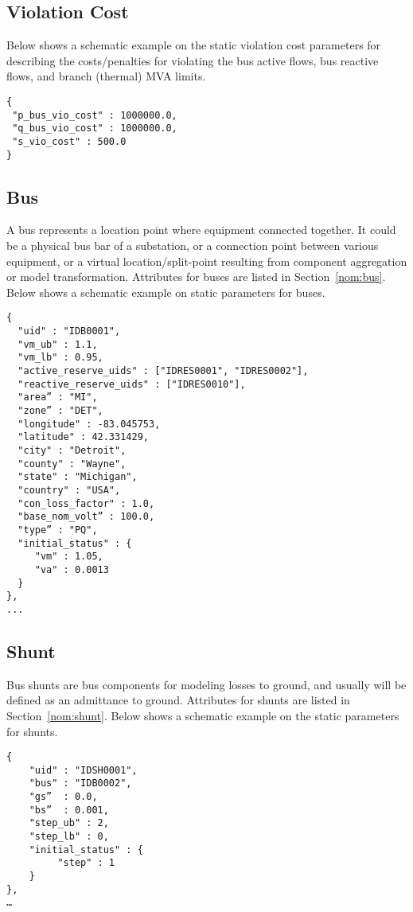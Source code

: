 \subsection{Violation Cost}
\label{sec:violation}
Below shows a schematic example on the static violation cost parameters for 
describing the costs/penalties for violating the bus active flows, bus reactive flows, 
and branch (thermal) MVA limits. 

\begin{verbatim}
{
 "p_bus_vio_cost" : 1000000.0,
 "q_bus_vio_cost" : 1000000.0,
 "s_vio_cost" : 500.0
}
\end{verbatim}


\subsection{Bus}
\label{sec:bus}
A bus represents a location point where equipment connected together.
It could be a physical bus bar of a substation, or 
a connection point between various equipment, 
or a virtual location/split-point resulting from
component aggregation or model transformation.
Attributes for buses are listed in Section~\ref{nom:bus}.
Below shows a schematic example on static parameters for buses.
\begin{verbatim}
{
  "uid" : "IDB0001",
  "vm_ub" : 1.1,
  "vm_lb" : 0.95,
  "active_reserve_uids" : ["IDRES0001", "IDRES0002"],
  "reactive_reserve_uids" : ["IDRES0010"],
  "area” : "MI",
  "zone” : "DET",
  "longitude" : -83.045753,
  "latitude" : 42.331429,
  "city" : "Detroit",
  "county" : "Wayne",
  "state" : "Michigan",
  "country" : "USA",
  "con_loss_factor" : 1.0,
  "base_nom_volt” : 100.0,
  "type” : "PQ",
  "initial_status" : {
     "vm" : 1.05,
     "va" : 0.0013
  }
},
...
\end{verbatim}


\subsection{Shunt}
\label{sec:shunt}
Bus shunts are bus components for modeling losses to ground, and 
usually will be defined as an admittance to ground.
Attributes for shunts are listed in Section~\ref{nom:shunt}.
Below shows a schematic example on the static parameters for shunts.
\begin{verbatim}
{
    "uid" : "IDSH0001",
    "bus" : "IDB0002",
    "gs”  : 0.0,
    "bs”  : 0.001,
    "step_ub" : 2,
    "step_lb" : 0,
    "initial_status" : {
         "step" : 1
    }
},
…    
\end{verbatim}


